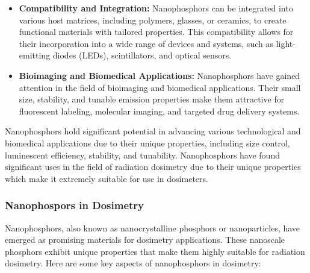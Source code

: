 \documentclass[../../Report.tex]{subfiles}
\begin{document}
\begin{itemize}
        \item \textbf{Compatibility and Integration: } Nanophosphors can be integrated into various host 
        matrices, including polymers, glasses, or ceramics, to create functional materials with tailored 
        properties. This compatibility allows for their incorporation into a wide range of devices and 
        systems, such as light-emitting diodes (LEDs), scintillators, and optical sensors.

        \item \textbf{Bioimaging and Biomedical Applications: } Nanophosphors have gained attention in the 
        field of bioimaging and biomedical applications. Their small size, stability, and tunable emission 
        properties make them attractive for fluorescent labeling, molecular imaging, and targeted drug 
        delivery systems.
    \end{itemize}

    Nanophosphors hold significant potential in advancing various technological and biomedical applications 
    due to their unique properties, including size control, luminescent efficiency, stability, and tunability.
    Nanophosphors have found significant uses in the field of radiation dosimetry due to their unique 
    properties which make it extremely suitable for use in dosimeters.
    
    \subsubsection*{\large Nanophospors in Dosimetry}
        Nanophosphors, also known as nanocrystalline phosphors or nanoparticles, have emerged as promising 
        materials for dosimetry applications. These nanoscale phosphors exhibit unique properties that make 
        them highly suitable for radiation dosimetry. Here are some key aspects of nanophosphors in dosimetry:
\end{document}
